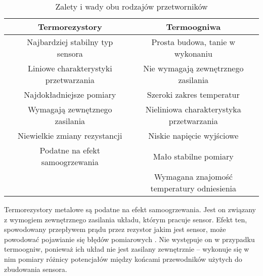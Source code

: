 \begin{table}[!htbp]
  \centering
  \caption{\label{tab:thermocouple-pros-cons}Zalety i wady obu rodzajów przetworników}
  \begin{tabular}{p{0.5cm}|c|c}
    \toprule
                                                                       & Termorezystory                        & Termoogniwa                                \\
    \midrule
    \parbox[t]{2mm}{} & Najbardziej stabilny typ sensora      & Prosta budowa, tanie w wykonaniu           \\
                                                                       & Liniowe charakterystyki przetwarzania & Nie wymagają zewnętrznego zasilania        \\
                                                                       & Najdokładniejsze pomiary              & Szeroki zakres temperatur                  \\
    \midrule
    \parbox[t]{2mm}{}   & Wymagają zewnętznego zasilania        & Nieliniowa charakterystyka przetwarzania   \\
                                                                       & Niewielkie zmiany rezystancji         & Niskie napięcie wyjściowe                  \\
                                                                       & Podatne na efekt samoogrzewania       & Mało stabilne pomiary                      \\
                                                                       &                                       & Wymagana znajomość temperatury odniesienia \\
    \bottomrule
  \end{tabular}
\end{table}

Termorezystory metalowe są podatne na efekt samoogrzewania. Jest on związany z wymogiem zewnętrznego
zasilania układu, którym pracuje sensor. Efekt ten, spowodowany przepływem prądu przez rezystor
jakim jest sensor, może powodować pojawianie się błędów pomiarowych \cite{self-heating}. Nie
występuje on w przypadku termoogniw, ponieważ ich układ nie jest zasilany zewnętrznie -- wykonuje
się w nim pomiary różnicy potencjałów między końcami przewodników użytych do zbudowania sensora.